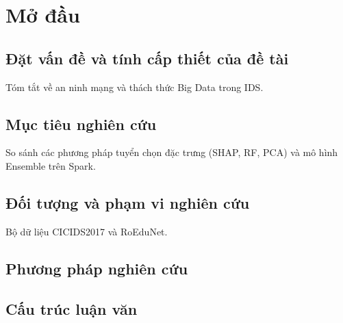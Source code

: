 \chapter{Mở đầu}

\section{Đặt vấn đề và tính cấp thiết của đề tài}
Tóm tắt về an ninh mạng và thách thức Big Data trong IDS.

\section{Mục tiêu nghiên cứu}
So sánh các phương pháp tuyển chọn đặc trưng (SHAP, RF, PCA) và mô hình Ensemble trên Spark.

\section{Đối tượng và phạm vi nghiên cứu}
Bộ dữ liệu CICIDS2017 và RoEduNet.

\section{Phương pháp nghiên cứu}

\section{Cấu trúc luận văn}
